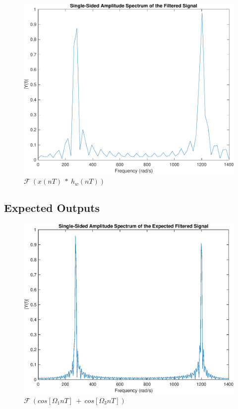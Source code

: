\documentclass[11pt]{article}
\begin{document}
\begin{figure}[H]
    \centering
    \includegraphics[scale=0.6]{filtered_mag} 
    \caption{$\mathscr{F} \ ( x( nT) \ *\ h_{w}( nT))$}
\end{figure}

\subsection{Expected Outputs}

\begin{figure}[H]
    \centering
    \includegraphics[scale=0.6]{efs.eps} 
    \caption{$\mathscr{F} \ ( cos[ \Omega _{1} nT] \ +\ cos[ \Omega _{3} nT])$}
\end{figure}

\newpage


\end{document}
